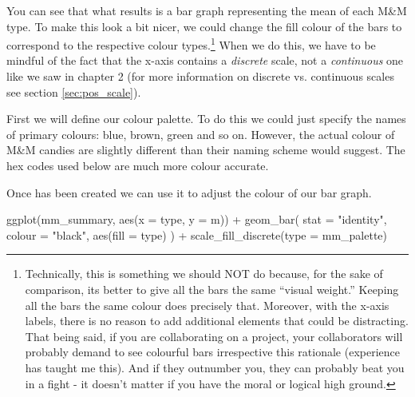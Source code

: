 You can see that what results is a bar graph representing the mean of each M\&M type. To make this look a bit nicer, we could change the fill colour of the bars to correspond to the respective colour types.\footnote{Technically, this is something we should NOT do because, for the sake of comparison, its better to give all the bars the same ``visual weight.'' Keeping all the bars the same colour does precisely that. Moreover, with the x-axis labels, there is no reason to add additional elements that could be distracting. That being said, if you are collaborating on a project, your collaborators will probably demand to see colourful bars irrespective this rationale (experience has taught me this). And if they outnumber you, they can probably beat you in a fight - it doesn't matter if you have the moral or logical high ground.} When we do this, we have to be mindful of the fact that the x-axis contains a \textit{discrete} scale, not a \textit{continuous} one like we saw in chapter 2 (for more information on discrete vs. continuous scales see section \ref{sec:pos_scale}).

First we will define our colour palette. To do this we could just specify the names of primary colours: blue, brown, green and so on. However, the actual colour of M\&M candies are slightly different than their naming scheme would suggest. The hex codes used below are much more colour accurate.


\vspace{1em}

Once  has been created we can use it to adjust the colour of our bar graph.

\begin{inR}
ggplot(mm_summary, aes(x = type, y = m)) +
  geom_bar(
    stat = "identity",
    colour = "black",
    aes(fill = type)
  ) +
  scale_fill_discrete(type = mm_palette)
\end{inR}

\vspace{2em}


